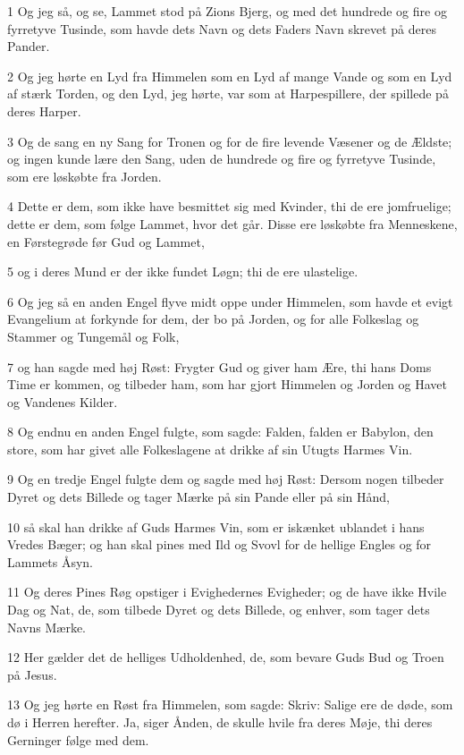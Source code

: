 \par 1 Og jeg så, og se, Lammet stod på Zions Bjerg, og med det hundrede og fire og fyrretyve Tusinde, som havde dets Navn og dets Faders Navn skrevet på deres Pander.
\par 2 Og jeg hørte en Lyd fra Himmelen som en Lyd af mange Vande og som en Lyd af stærk Torden, og den Lyd, jeg hørte, var som at Harpespillere, der spillede på deres Harper.
\par 3 Og de sang en ny Sang for Tronen og for de fire levende Væsener og de Ældste; og ingen kunde lære den Sang, uden de hundrede og fire og fyrretyve Tusinde, som ere løskøbte fra Jorden.
\par 4 Dette er dem, som ikke have besmittet sig med Kvinder, thi de ere jomfruelige; dette er dem, som følge Lammet, hvor det går. Disse ere løskøbte fra Menneskene, en Førstegrøde før Gud og Lammet,
\par 5 og i deres Mund er der ikke fundet Løgn; thi de ere ulastelige.
\par 6 Og jeg så en anden Engel flyve midt oppe under Himmelen, som havde et evigt Evangelium at forkynde for dem, der bo på Jorden, og for alle Folkeslag og Stammer og Tungemål og Folk,
\par 7 og han sagde med høj Røst: Frygter Gud og giver ham Ære, thi hans Doms Time er kommen, og tilbeder ham, som har gjort Himmelen og Jorden og Havet og Vandenes Kilder.
\par 8 Og endnu en anden Engel fulgte, som sagde: Falden, falden er Babylon, den store, som har givet alle Folkeslagene at drikke af sin Utugts Harmes Vin.
\par 9 Og en tredje Engel fulgte dem og sagde med høj Røst: Dersom nogen tilbeder Dyret og dets Billede og tager Mærke på sin Pande eller på sin Hånd,
\par 10 så skal han drikke af Guds Harmes Vin, som er iskænket ublandet i hans Vredes Bæger; og han skal pines med Ild og Svovl for de hellige Engles og for Lammets Åsyn.
\par 11 Og deres Pines Røg opstiger i Evighedernes Evigheder; og de have ikke Hvile Dag og Nat, de, som tilbede Dyret og dets Billede, og enhver, som tager dets Navns Mærke.
\par 12 Her gælder det de helliges Udholdenhed, de, som bevare Guds Bud og Troen på Jesus.
\par 13 Og jeg hørte en Røst fra Himmelen, som sagde: Skriv: Salige ere de døde, som dø i Herren herefter. Ja, siger Ånden, de skulle hvile fra deres Møje, thi deres Gerninger følge med dem.
